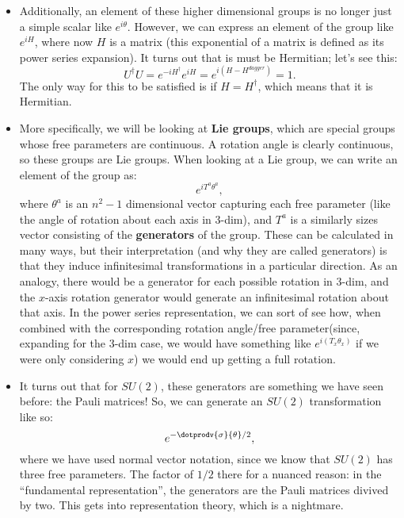 \begin{itemize}
    \item Additionally, an element of these higher dimensional groups is no longer just a simple scalar like $e^{i\theta}$. However, we can express an element of the group like $e^{iH}$, where now $H$ is a matrix (this exponential of a matrix is defined as its power series expansion). It turns out that is must be Hermitian; let's see this:
        \begin{equation*}
            U^{\dagger}U = e^{-iH^{\dagger}}e^{iH} = e^{i(H-H^{dagger})} = 1.
        \end{equation*}
        The only way for this to be satisfied is if $H = H^{\dagger}$, which means that it is Hermitian.
    \item More specifically, we will be looking at \textbf{Lie groups}, which are special groups whose free parameters are continuous. A rotation angle is clearly continuous, so these groups are Lie groups. When looking at a Lie group, we can write an element of the group as:
        \begin{equation*}
            e^{i T^a \theta^a},
        \end{equation*}
        where $\theta^a$ is an $n^2-1$ dimensional vector capturing each free parameter (like the angle of rotation about each axis in 3-dim), and $T^a$ is a similarly sizes vector consisting of the \textbf{generators} of the group. These can be calculated in many ways, but their interpretation (and why they are called generators) is that they induce infinitesimal transformations in a particular direction. As an analogy, there would be a generator for each possible rotation in 3-dim, and the $x$-axis rotation generator would generate an infinitesimal rotation about that axis. In the power series representation, we can sort of see how, when combined with the corresponding rotation angle/free parameter(since, expanding for the 3-dim case, we would have something like $e^{i(T_x\theta_x)}$ if we were only considering $x$) we would end up getting a full rotation.
    \item It turns out that for $SU(2)$, these generators are something we have seen before: the Pauli matrices! So, we can generate an $SU(2)$ transformation like so:
        \begin{equation*}
            e^{-\dotprodv{\sigma}{\theta}/2},
        \end{equation*}
        where we have used normal vector notation, since we know that $SU(2)$ has three free parameters. The factor of $1/2$ there for a nuanced reason: in the ``fundamental representation'', the generators are the Pauli matrices divived by two. This gets into representation theory, which is a nightmare.

\end{itemize}
